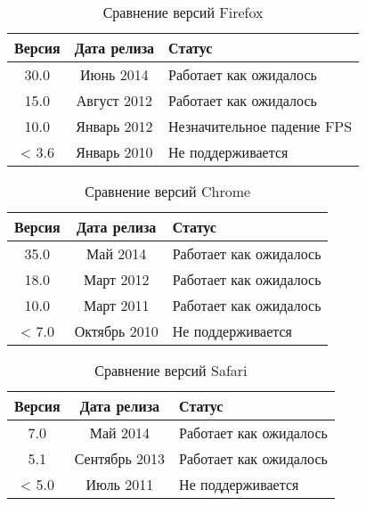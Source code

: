 \begin{table}[h!]
  \caption{\label{tab:brows:ff}Сравнение версий Firefox}
  \begin{center}
    \begin{tabular}{|c|c|l|}
      \hline
      Версия & Дата релиза & Статус \\
      \hline
      30.0 & Июнь 2014 & Работает как ожидалось \\
      15.0 & Август 2012 & Работает как ожидалось \\
      10.0 & Январь 2012 & Незначительное падение FPS \\
      < 3.6 & Январь 2010 & Не поддерживается \\
      \hline
    \end{tabular}
  \end{center}
\end{table}

\begin{table}[h!]
  \caption{\label{tab:brows:chrome}Сравнение версий Chrome}
  \begin{center}
    \begin{tabular}{|c|c|l|}
      \hline
      Версия & Дата релиза & Статус \\
      \hline
      35.0 & Май 2014 & Работает как ожидалось \\
      18.0 & Март 2012 & Работает как ожидалось \\
      10.0 & Март 2011 & Работает как ожидалось \\
      < 7.0 & Октябрь 2010 & Не поддерживается \\
      \hline
    \end{tabular}
  \end{center}
\end{table}

\begin{table}[h!]
  \caption{\label{tab:brows:safari}Сравнение версий Safari}
  \begin{center}
    \begin{tabular}{|c|c|l|}
      \hline
      Версия & Дата релиза & Статус \\
      \hline
      7.0 & Май 2014 & Работает как ожидалось \\
      5.1 & Сентябрь 2013 & Работает как ожидалось \\
      < 5.0 & Июль 2011 & Не поддерживается \\
      \hline
    \end{tabular}
  \end{center}
\end{table}

